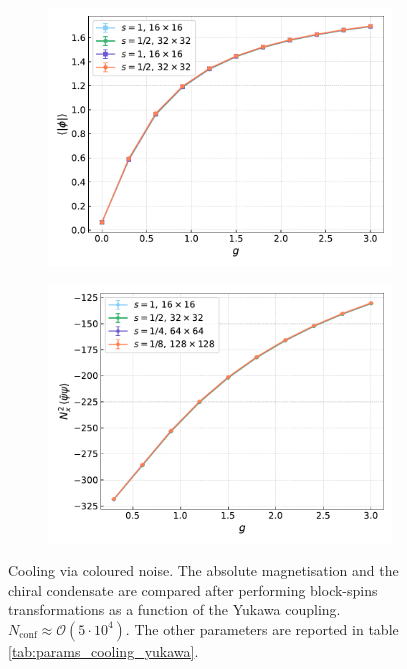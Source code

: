 \begin{figure}[hbp]
    \centering
    \begin{subfigure}[b]{0.48\textwidth}
        \includegraphics[width=1.05\textwidth]{figures/cooling/yukawa_scan/magnetisation.pdf}
    \end{subfigure}
    \hfill
    \begin{subfigure}[b]{0.48\textwidth}
        \includegraphics[width=1.05\textwidth]{figures/cooling/yukawa_scan/condensate.pdf}
    \end{subfigure}
    \caption[Cooling stochastic quantisation: fields as a function of the Yukawa coupling.]{Cooling via coloured noise. The absolute magnetisation and the chiral condensate are compared after performing block-spins transformations as a function of the Yukawa coupling. \\ $N_\text{conf} \approx \mathcal{O}(5 \cdot 10^4)$. The other parameters are reported in table \ref{tab:params_cooling_yukawa}.}
    \label{fig:cooling_M_psibarpsi}
\end{figure}\\
